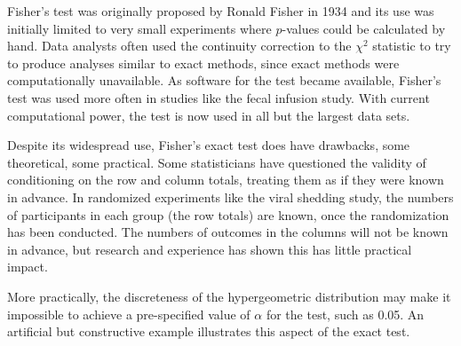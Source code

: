 Fisher's test was originally proposed by Ronald Fisher in 1934 and its use was initially limited to very small experiments where $p$-values could be calculated by hand.  Data analysts often used the continuity correction to the $\chi^2$ statistic to try to produce analyses similar to exact methods, since exact methods were computationally unavailable. As software for the test became available, Fisher's test was used more often in studies like the fecal infusion study.  With current computational power, the test is now used in all but the largest data sets.  

Despite its widespread use, Fisher's exact test does have drawbacks, some theoretical, some practical.  Some statisticians have questioned the validity of conditioning on the row and column totals, treating them as if they were known in advance.  In randomized experiments like the viral shedding study, the numbers of participants in each group (the row totals) are known, once the randomization has been conducted. The numbers of outcomes in the columns will not be known in advance, but research and experience has shown this has little practical impact.

More practically, the discreteness of the hypergeometric distribution may make it impossible to achieve a pre-specified value of $\alpha$ for the test, such as 0.05.  An artificial but constructive example illustrates this aspect of the exact test.

